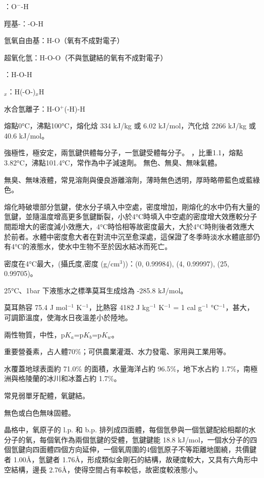 \documentclass[a4paper,12pt]{report}
\begin{document}
\bit
\item {}：O$^-$-H
\item 羥基-：-O-H
\item 氫氧自由基：H-O（氧有不成對電子）
\item 超氧化氫：H-O-O（不與氫鍵結的氧有不成對電子）
\item {}：H-O-H
\item {}$_x$：H(-O-)$_x$H
\item 水合氫離子：H-O$^+$(-H)-H
\eit
{}
\bit
\item 熔點0°C，沸點100°C，熔化焓 334 kJ/kg 或 6.02 kJ/mol，汽化焓 2266 kJ/kg 或 40.6 kJ/mol。
\item 強極性，極安定，兩氫鍵供體每分子，一氫鍵受體每分子。
\eit
{}
，比重1.1，熔點3.82°C，沸點101.4°C，常作為中子減速劑。
無色、無臭、無味氣體。
\bit
\item 無臭、無味液體，常見溶劑與優良游離溶劑，薄時無色透明，厚時略帶藍色或藍綠色。
\item 熔化時破壞部分氫鍵，使水分子填入中空處，密度增加，剛熔化的水中仍有大量的氫鍵，並隨溫度增高更多氫鍵斷裂，小於4°C時填入中空處的密度增大效應較分子間距增大的密度減小效應大，4°C時恰相等故密度最大，大於4°C時則後者效應大於前者。水體中密度愈大者在對流中沉至愈深處，這保證了冬季時淡水水體底部仍有4°C的液態水，使水中生物不至於因水結冰而死亡。
\item 密度在4°C最大，(攝氏度,密度 (g/cm$^3$))：(0, 0.99984), (4, 0.99997), (25, 0.99705)。
\item 25°C、1bar 下液態水之標準莫耳生成焓為 -285.8 kJ/mol。
\item 莫耳熱容 75.4 J mol$^{-1}$ K$^{-1}$，比熱容 4182 J kg$^{-1}$ K$^{-1}$ = 1 cal g$^{-1}$ °C$^{-1}$，甚大，可調節溫度，使海水日夜溫差小於陸地。
\item 兩性物質，中性，p$K_a$=p$K_b$=p$K_w$。
\item 重要營養素，占人體70\%；可供農業灌溉、水力發電、家用與工業用等。
\item 水覆蓋地球表面約 71.0\% 的面積，水量海洋占約 96.5\%，地下水占約 1.7\%，南極洲與格陵蘭的冰川和冰蓋占約 1.7\%。
\item 常見弱單牙配體，氧鍵結。
\eit
{}
\bit
\item 無色或白色無味固體。
\item 晶格中，氧原子的 l.p. 和 b.p. 排列成四面體，每個氫參與一個氫鍵配給相鄰的水分子的氧，每個氧作為兩個氫鍵的受體，氫鍵鍵能 18.8 kJ/mol，一個水分子的四個氫鍵向四面體四個方向延伸，一個氧周圍的4個氫原子不等距離地圍繞，共價鍵者 1.00\AA，氫鍵者 1.76\AA，形成類似金剛石的結構，故硬度較大，又具有六角形中空結構，邊長  2.76\AA，使得空間占有率較低，故密度較液態小。
\end{document}
